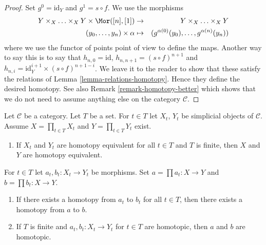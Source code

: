 \begin{proof}
Set $g^0 = \text{id}_Y$ and $g^1 = s \circ f$.
We use the morphisms
\begin{eqnarray*}
Y \times_X \ldots \times_X Y \times \Mor([n], [1])
& \to &
Y \times_X \ldots \times_X Y \\
(y_0, \ldots, y_n) \times \alpha
& \mapsto &
(g^{\alpha(0)}(y_0), \ldots, g^{\alpha(n)}(y_n))
\end{eqnarray*}
where we use the functor of points point of view to define the maps.
Another way to say this is to say that
$h_{n, 0} = \text{id}$, $h_{n, n + 1} = (s \circ f)^{n + 1}$ and
$h_{n, i} = \text{id}_Y^{i + 1} \times (s \circ f)^{n + 1 - i}$.
We leave it to the reader to show that these satisfy the relations
of Lemma \ref{lemma-relations-homotopy}. Hence they define
the desired homotopy. See also Remark \ref{remark-homotopy-better}
which shows that
we do not need to assume anything else on the category $\mathcal{C}$.
\end{proof}

\begin{lemma}
\label{lemma-products-homotopy}
Let $\mathcal{C}$ be a category. Let $T$ be a set. For $t \in T$
let $X_t$, $Y_t$ be simplicial objects of $\mathcal{C}$. Assume
$X = \prod_{t \in T} X_t$ and $Y = \prod_{t \in T} Y_t$ exist.
\begin{enumerate}
\item If $X_t$ and $Y_t$ are homotopy equivalent for all $t \in T$
and $T$ is finite, then $X$ and $Y$ are homotopy equivalent.
\end{enumerate}
For $t \in T$ let $a_t, b_t : X_t \to Y_t$ be morphisms.
Set $a = \prod a_t : X \to Y$ and $b = \prod b_t : X \to Y$.
\begin{enumerate}
\item[(2)] If there exists a homotopy from $a_t$ to $b_t$ for
all $t \in T$, then there exists a homotopy from $a$ to $b$.
\item[(3)] If $T$ is finite and $a_t, b_t : X_t \to Y_t$ for $t \in T$
are homotopic, then $a$ and $b$ are homotopic.
\end{enumerate}
\end{lemma}

